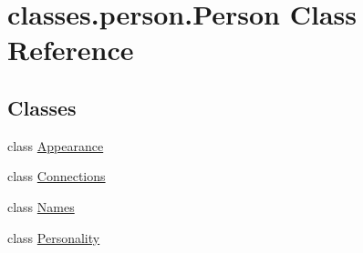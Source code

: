 \hypertarget{classclasses_1_1person_1_1Person}{}\section{classes.\+person.\+Person Class Reference}
\label{classclasses_1_1person_1_1Person}
\subsection*{Classes}
\begin{DoxyCompactItemize}
\item 
class \hyperlink{classclasses_1_1person_1_1Person_1_1Appearance}{Appearance}
\item 
class \hyperlink{classclasses_1_1person_1_1Person_1_1Connections}{Connections}
\item 
class \hyperlink{classclasses_1_1person_1_1Person_1_1Names}{Names}
\item 
class \hyperlink{classclasses_1_1person_1_1Person_1_1Personality}{Personality}
\end{DoxyCompactItemize}
